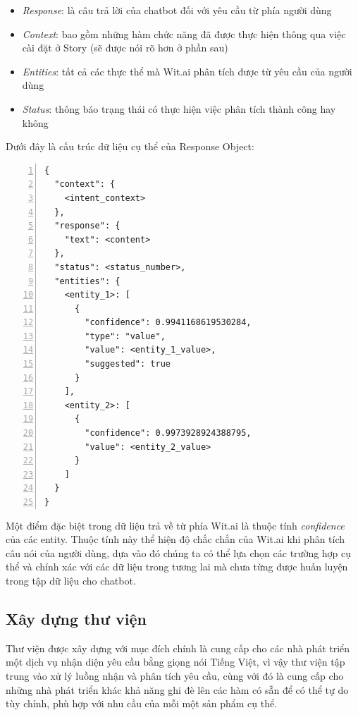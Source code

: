 \documentclass[12pt]{report}
\begin{document}
\begin{itemize}
	\item \textit{Response}: là câu trả lời của chatbot đối với yêu cầu từ phía người dùng
	\item \textit{Context}: bao gồm những hàm chức năng đã được thực hiện thông qua việc cài đặt ở Story (sẽ được nói rõ hơn ở phần sau)
	\item \textit{Entities}: tất cả các thực thể mà Wit.ai phân tích được từ yêu cầu của người dùng
	\item \textit{Status}: thông báo trạng thái có thực hiện việc phân tích thành công hay không
\end{itemize}

Dưới đây là cấu trúc dữ liệu cụ thể của Response Object:

\begin{lstlisting}[frame=lines, basicstyle=\footnotesize\ttfamily, numbers=left, numberstyle=\tiny\color{black},caption= {Cấu trúc một API trả về}, backgroundcolor=\color{background}]
{
  "context": {
    <intent_context>
  },
  "response": {
    "text": <content>
  },
  "status": <status_number>,
  "entities": {
    <entity_1>: [
      {
        "confidence": 0.9941168619530284,
        "type": "value",
        "value": <entity_1_value>,
        "suggested": true
      }
    ],
    <entity_2>: [
      {
        "confidence": 0.9973928924388795,
        "value": <entity_2_value>
      }
    ]
  }
}
\end{lstlisting}

Một điểm đặc biệt trong dữ liệu trả về từ phía Wit.ai là thuộc tính \textit{confidence} của các entity. Thuộc tính này thể hiện độ chắc chắn của Wit.ai khi phân tích câu nói của người dùng, dựa vào đó chúng ta có thể lựa chọn các trường hợp cụ thể và chính xác với các dữ liệu trong tương lai mà chưa từng được huấn luyện trong tập dữ liệu cho chatbot.

\subsection{Xây dựng thư viện}

Thư viện được xây dựng với mục đích chính là cung cấp cho các nhà phát triển một dịch vụ nhận diện yêu cầu bằng giọng nói Tiếng Việt, vì vậy thư viện tập trung vào xử lý luồng nhận và phân tích yêu cầu, cùng với đó là cung cấp cho những nhà phát triển khác khả năng ghi đè lên các hàm có sẵn để có thể tự do tùy chỉnh, phù hợp với nhu cầu của mỗi một sản phẩm cụ thể.
\end{document}
